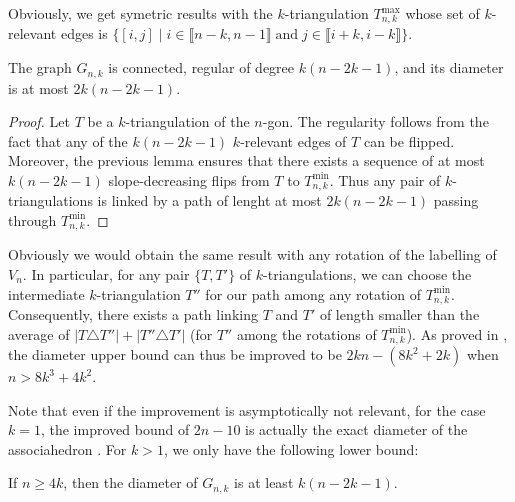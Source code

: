 \documentclass[12pt]{amsart}
\begin{document}
Obviously, we get symetric results with the $k$-triangulation $T_{n,k}^{\max}$ whose set of $k$-relevant edges is $\{[i,j]\;|\;i\in\llbracket n-k,n-1\rrbracket\;\mathrm{and}\;j\in\llbracket i+k,i-k\rrbracket\}$.

\begin{corollary}
The graph $G_{n,k}$ is connected, regular of degree $k(n-2k-1)$, and its diameter is at most $2k(n-2k-1)$.
\end{corollary}

\begin{proof}
Let $T$ be a $k$-triangulation of the $n$-gon. The regularity follows from the fact that any of the $k(n-2k-1)$ $k$-relevant edges of $T$ can be flipped. Moreover, the previous lemma ensures that there exists a sequence of at most $k(n-2k-1)$ slope-decreasing flips from $T$ to $T_{n,k}^{\min}$. Thus any pair of $k$-triangulations is linked by a path of lenght at most $2k(n-2k-1)$ passing through $T_{n,k}^{\min}$.
\end{proof}

Obviously we would obtain the same result with any rotation of the labelling of $V_n$. In particular, for any pair $\{T,T'\}$ of $k$-triangulations, we can choose the intermediate $k$-triangulation $T''$ for our path among any rotation of $T_{n,k}^{\min}$. Consequently, there exists a path linking $T$ and $T'$ of length smaller than the average of $|T\triangle T''|+|T''\triangle T'|$ (for $T''$ among the rotations of $T_{n,k}^{\min}$). As proved in \cite{n-gdfcp-00}, the diameter upper bound can thus be improved to be $2kn-(8k^2+2k)$ when $n>8k^3+4k^2$.

Note that even if the improvement is asymptotically not relevant, for the case $k=1$, the improved bound of $2n-10$ is actually the exact diameter of the associahedron \cite{stt-rdthg-88}. For $k>1$, we only have the following lower bound:

\begin{lemma}\label{diamin}
If $n\ge 4k$, then the diameter of $G_{n,k}$ is at least $k(n-2k-1)$.
\end{lemma}
\end{document}
